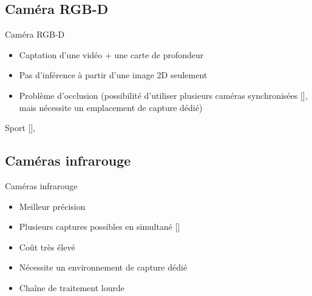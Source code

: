 \documentclass[svgnames]{beamer}
\newcommand{\mycite}[1]{[\textit{\cite{#1}}]}
\begin{document}
	\subsection{Caméra RGB-D}
	\begin{frame}{\subsecname}
		\begin{block}{Caméra RGB-D}
			\begin{itemize}[label=$\bullet$]
				\item Captation d'une vidéo + une carte de profondeur
				\item Pas d'inférence à partir d'une image 2D seulement
				\item Problème d'occlusion (possibilité d'utiliser plusieurs caméras synchronisées \mycite{Regazzoni2014Rcv}, mais nécessite un emplacement de capture dédié)
			\end{itemize}
			Sport \mycite{YAMAOKA2013912, Yoshinaga2015Doa, Kora20151559}, 
		\end{block}
	
	\end{frame}
	
	\subsection{Caméras infrarouge}
	\begin{frame}{\subsecname}
		\begin{block}{Caméras infrarouge}
			\begin{itemize}[label=$\bullet$]
				\item Meilleur précision
				\item Plusieurs captures possibles en simultané \mycite{Pfister2014Cao, Yang2016HUL}
				\item Coût très élevé
				\item Nécessite un environnement de capture dédié
				\item Chaîne de traitement lourde
			\end{itemize}
		\end{block}
	\end{frame}
	
\end{document}
